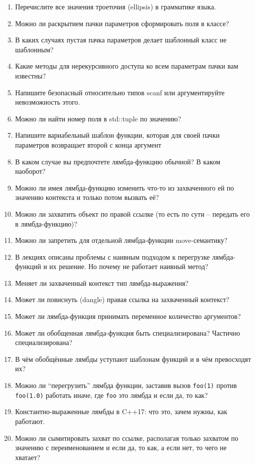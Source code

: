 \documentclass[a4paper,12pt,oneside]{book}
\begin{document}
\begin{enumerate}
\item Перечислите все значения троеточия (ellipsis) в грамматике языка.
\item Можно ли раскрытием пачки параметров сформировать поля в классе?
\item В каких случаях пустая пачка параметров делает шаблонный класс не шаблонным?
\item Какие методы для нерекурсивного доступа ко всем параметрам пачки вам известны?
\item Напишите безопасный относительно типов scanf или аргументируйте невозможность этого.
\item Можно ли найти номер поля в std::tuple по значению?
\item Напишите вариабельный шаблон функции, которая для своей пачки параметров возвращает второй с конца аргумент
%
%
\item В каком случае вы предпочтете лямбда-функцию обычной? В каком наоборот?
\item Можно ли имея лямбда-функцию изменить что-то из захваченного ей по значению контекста и только потом вызвать её?
\item Можно ли захватить объект по правой ссылке (то есть по сути -- передать его в лямбда-функцию)?
\item Можно ли запретить для отдельной лямбда-функции move-семантику?
\item В лекциях описаны проблемы с наивным подходом к перегрузке лямбда-функций и их решение. Но почему не работает наивный метод?
\item Меняет ли захваченный контекст тип лямбда-выражения?
\item Может ли повиснуть (dangle) правая ссылка на захваченный контекст?
\item Может ли лямбда-функция принимать переменное количество аргументов?
\item Может ли обобщенная лямбда-функция быть специализирована? Частично специализирована?
\item В чём обобщённые лямбды уступают шаблонам функций и в чём превосходят их?
\item Можно ли ``перегрузить'' лямбда функции, заставив вызов \lstinline!foo(1)! против \lstinline!foo(1.0)! работать иначе, где \lstinline!foo! это лямбда и если да, то как?
\item Константно-выраженные лямбды в C++17: что это, зачем нужны, как работают.
\item Можно ли сымитировать захват по ссылке, располагая только захватом по значению с переименованием и если да, то как, а если нет, то чего не хватает?

\end{enumerate}
\end{document}
